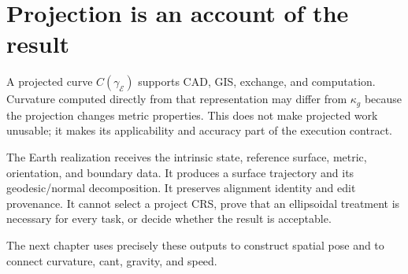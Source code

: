 \section{Projection is an account of the result}

A projected curve \(C(\gamma_{\mathcal E})\) supports CAD, GIS, exchange,
and computation. Curvature computed directly from that representation
may differ from \(\kappa_g\) because the projection changes metric
properties. This does not make projected work unusable; it makes its
applicability and accuracy part of the execution contract.

The Earth realization receives the intrinsic state, reference surface,
metric, orientation, and boundary data. It produces a surface trajectory
and its geodesic/normal decomposition. It preserves alignment identity
and edit provenance. It cannot select a project CRS, prove that an
ellipsoidal treatment is necessary for every task, or decide whether the
result is acceptable.

The next chapter uses precisely these outputs to construct spatial pose
and to connect curvature, cant, gravity, and speed.
